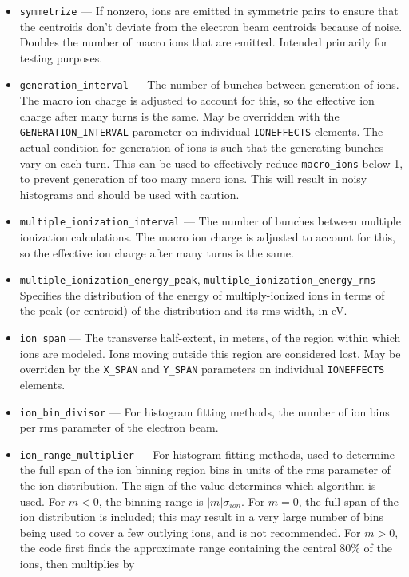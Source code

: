 \documentclass[11pt]{article}
\begin{document}
\begin{itemize}
\item \verb|symmetrize| --- If nonzero, ions are emitted in symmetric pairs to ensure that the centroids don't deviate
  from the electron beam centroids because of noise. Doubles the number of macro ions that are emitted. Intended primarily for
  testing purposes.
\item \verb|generation_interval| --- The number of bunches between generation of ions. The macro ion charge is adjusted
  to account for this, so the effective ion charge after many turns is the same. May be overridden with the
  \verb|GENERATION_INTERVAL| parameter on individual \verb|IONEFFECTS| elements. The actual condition for generation of
  ions is such that the generating bunches vary on each turn. This can be used to effectively reduce \verb|macro_ions|
  below 1, to prevent generation of too many macro ions.
  This will result in noisy histograms and should be used with caution.
\item \verb|multiple_ionization_interval| --- The number of bunches between multiple ionization calculations.  
      The macro ion charge is adjusted
      to account for this, so the effective ion charge after many turns is the same.
\item \verb|multiple_ionization_energy_peak|, \verb|multiple_ionization_energy_rms| --- Specifies the distribution of
  the energy of multiply-ionized ions in terms of the peak (or centroid) of the distribution and its rms width, in eV.
\item \verb|ion_span| --- The transverse half-extent, in meters, of the region within which ions are modeled.
  Ions moving outside this region are considered lost. May be overriden by the \verb|X_SPAN| and \verb|Y_SPAN| parameters
  on individual \verb|IONEFFECTS| elements.
\item \verb|ion_bin_divisor| --- For histogram fitting methods, the number of ion bins per rms parameter of the electron beam.
\item \verb|ion_range_multiplier| --- For  histogram fitting methods,
  used to determine the full span of the ion binning region bins in units of the rms parameter of the ion distribution.
  The sign of the value determines which algorithm is used.
  For $m<0$, the binning range is $\left|m\right|\sigma_{ion}$.
  For $m=0$, the full span of the ion distribution is included; this may result in a very large number of bins being
  used to cover a few outlying ions, and is not recommended.
  For $m>0$, the code first finds the approximate range containing the central 80\% of the ions, then multiplies by

\end{itemize}
\end{document}
